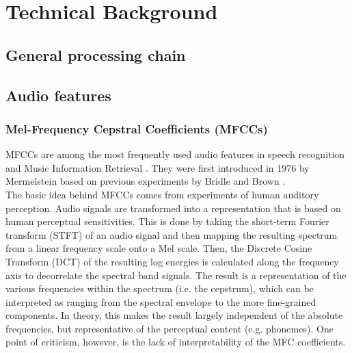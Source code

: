 
\chapter{Technical Background}	\label{chap:background}
\section{General processing chain}
\section{Audio features}
\subsection{Mel-Frequency Cepstral Coefficients (MFCCs)} 
MFCCs are among the most frequently used audio features in speech recognition and Music Information Retrieval \cite{sahidullah}\cite{meinard_retrieval}. They were first introduced in 1976 by Mermelstein \cite{mermelstein}\cite{davis_mermelstein} based on previous experiments by Bridle and Brown \cite{bridle_brown}.\\

The basic idea behind MFCCs comes from experiments of human auditory perception. Audio signals are transformed into a representation that is based on human perceptual sensitivities. This is done by taking the short-term Fourier transform (STFT) of an audio signal and then mapping the resulting spectrum from a linear frequency scale onto a Mel scale. Then, the Discrete Cosine Transform (DCT) of the resulting log energies is calculated along the frequency axis to decorrelate the spectral band signals. The result is a representation of the various frequencies within the spectrum (i.e. the cepstrum), which can be interpreted as ranging from the spectral envelope to the more fine-grained components. In theory, this makes the result largely independent of the absolute frequencies, but representative of the perceptual content (e.g. phonemes). One point of criticism, however, is the lack of interpretability of the MFC coefficients.\\

